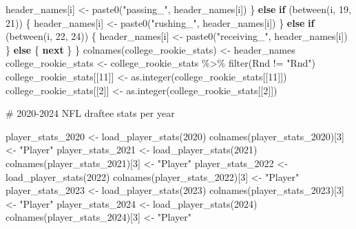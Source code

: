 \documentclass[
  letterpaper,
  DIV=11,
  numbers=noendperiod]{scrartcl}
\newenvironment{Shaded}{\begin{snugshade}}{\end{snugshade}}
\newcommand{\CommentTok}[1]{\textcolor[rgb]{0.37,0.37,0.37}{#1}}
\newcommand{\ControlFlowTok}[1]{\textcolor[rgb]{0.00,0.23,0.31}{\textbf{#1}}}
\newcommand{\DecValTok}[1]{\textcolor[rgb]{0.68,0.00,0.00}{#1}}
\newcommand{\FunctionTok}[1]{\textcolor[rgb]{0.28,0.35,0.67}{#1}}
\newcommand{\NormalTok}[1]{\textcolor[rgb]{0.00,0.23,0.31}{#1}}
\newcommand{\OtherTok}[1]{\textcolor[rgb]{0.00,0.23,0.31}{#1}}
\newcommand{\SpecialCharTok}[1]{\textcolor[rgb]{0.37,0.37,0.37}{#1}}
\newcommand{\StringTok}[1]{\textcolor[rgb]{0.13,0.47,0.30}{#1}}
\begin{document}
\begin{Shaded}
\begin{Highlighting}[]
\NormalTok{    header\_names[i] }\OtherTok{\textless{}{-}} \FunctionTok{paste0}\NormalTok{(}\StringTok{"passing\_"}\NormalTok{, header\_names[i])}
\NormalTok{  \} }\ControlFlowTok{else} \ControlFlowTok{if}\NormalTok{ (}\FunctionTok{between}\NormalTok{(i, }\DecValTok{19}\NormalTok{, }\DecValTok{21}\NormalTok{)) \{}
\NormalTok{    header\_names[i] }\OtherTok{\textless{}{-}} \FunctionTok{paste0}\NormalTok{(}\StringTok{"rushing\_"}\NormalTok{, header\_names[i])}
\NormalTok{  \} }\ControlFlowTok{else} \ControlFlowTok{if}\NormalTok{ (}\FunctionTok{between}\NormalTok{(i, }\DecValTok{22}\NormalTok{, }\DecValTok{24}\NormalTok{)) \{}
\NormalTok{    header\_names[i] }\OtherTok{\textless{}{-}} \FunctionTok{paste0}\NormalTok{(}\StringTok{"receiving\_"}\NormalTok{, header\_names[i])}
\NormalTok{  \} }\ControlFlowTok{else}\NormalTok{ \{}
    \ControlFlowTok{next}
\NormalTok{  \}}
\NormalTok{\}}
\FunctionTok{colnames}\NormalTok{(college\_rookie\_stats) }\OtherTok{\textless{}{-}}\NormalTok{ header\_names}
\NormalTok{college\_rookie\_stats }\OtherTok{\textless{}{-}}\NormalTok{ college\_rookie\_stats }\SpecialCharTok{\%\textgreater{}\%}
  \FunctionTok{filter}\NormalTok{(Rnd }\SpecialCharTok{!=} \StringTok{"Rnd"}\NormalTok{)}
\NormalTok{college\_rookie\_stats[[}\DecValTok{11}\NormalTok{]] }\OtherTok{\textless{}{-}} \FunctionTok{as.integer}\NormalTok{(college\_rookie\_stats[[}\DecValTok{11}\NormalTok{]])}
\NormalTok{college\_rookie\_stats[[}\DecValTok{2}\NormalTok{]] }\OtherTok{\textless{}{-}} \FunctionTok{as.integer}\NormalTok{(college\_rookie\_stats[[}\DecValTok{2}\NormalTok{]])}

\CommentTok{\# 2020{-}2024 NFL draftee stats per year}

\NormalTok{player\_stats\_2020 }\OtherTok{\textless{}{-}} \FunctionTok{load\_player\_stats}\NormalTok{(}\DecValTok{2020}\NormalTok{)}
\FunctionTok{colnames}\NormalTok{(player\_stats\_2020)[}\DecValTok{3}\NormalTok{] }\OtherTok{\textless{}{-}} \StringTok{"Player"}
\NormalTok{player\_stats\_2021 }\OtherTok{\textless{}{-}} \FunctionTok{load\_player\_stats}\NormalTok{(}\DecValTok{2021}\NormalTok{)}
\FunctionTok{colnames}\NormalTok{(player\_stats\_2021)[}\DecValTok{3}\NormalTok{] }\OtherTok{\textless{}{-}} \StringTok{"Player"}
\NormalTok{player\_stats\_2022 }\OtherTok{\textless{}{-}} \FunctionTok{load\_player\_stats}\NormalTok{(}\DecValTok{2022}\NormalTok{)}
\FunctionTok{colnames}\NormalTok{(player\_stats\_2022)[}\DecValTok{3}\NormalTok{] }\OtherTok{\textless{}{-}} \StringTok{"Player"}
\NormalTok{player\_stats\_2023 }\OtherTok{\textless{}{-}} \FunctionTok{load\_player\_stats}\NormalTok{(}\DecValTok{2023}\NormalTok{)}
\FunctionTok{colnames}\NormalTok{(player\_stats\_2023)[}\DecValTok{3}\NormalTok{] }\OtherTok{\textless{}{-}} \StringTok{"Player"}
\NormalTok{player\_stats\_2024 }\OtherTok{\textless{}{-}} \FunctionTok{load\_player\_stats}\NormalTok{(}\DecValTok{2024}\NormalTok{)}
\FunctionTok{colnames}\NormalTok{(player\_stats\_2024)[}\DecValTok{3}\NormalTok{] }\OtherTok{\textless{}{-}} \StringTok{"Player"}


\end{Highlighting}
\end{Shaded}
\end{document}

